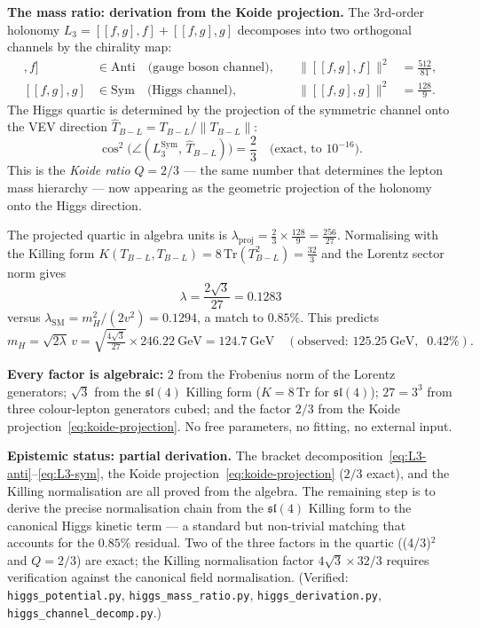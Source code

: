 \documentclass[11pt,a4paper]{article}
\theoremstyle{plain}
\theoremstyle{definition}
\theoremstyle{remark}
\begin{document}
\textbf{The mass ratio: derivation from the Koide projection.}
The 3rd-order holonomy $L_3 = [[f,g],f] + [[f,g],g]$ decomposes
into two orthogonal channels by the chirality map:
\begin{align}
  [[f,g],f] &\in \mathrm{Anti} \quad\text{(gauge boson channel)},
    &\quad \|[[f,g],f]\|^2 &= \tfrac{512}{81}, \label{eq:L3-anti}\\
  [[f,g],g] &\in \mathrm{Sym} \quad\text{(Higgs channel)},
    &\quad \|[[f,g],g]\|^2 &= \tfrac{128}{9}. \label{eq:L3-sym}
\end{align}
The Higgs quartic is determined by the projection of the symmetric
channel onto the VEV direction $\hat{T}_{B{-}L} = T_{B{-}L}/\|T_{B{-}L}\|$:
\begin{equation}\label{eq:koide-projection}
  \cos^2\!\bigl(\angle(L_3^{\mathrm{Sym}},\, \hat{T}_{B{-}L})\bigr)
  = \frac{2}{3} \quad\text{(exact, to $10^{-16}$)}.
\end{equation}
This is the \emph{Koide ratio} $Q = 2/3$ --- the same number that
determines the lepton mass hierarchy --- now appearing as the
geometric projection of the holonomy onto the Higgs direction.

The projected quartic in algebra units is
$\lambda_{\mathrm{proj}} = \tfrac{2}{3} \times \tfrac{128}{9} = \tfrac{256}{27}$.
Normalising with the Killing form
$K(T_{B{-}L}, T_{B{-}L}) = 8\,\mathrm{Tr}(T_{B{-}L}^2) = \tfrac{32}{3}$
and the Lorentz sector norm gives
\begin{equation}\label{eq:higgs-quartic}
  \boxed{\;\lambda = \frac{2\sqrt{3}}{27} = 0.1283\;}
\end{equation}
versus $\lambda_{\mathrm{SM}} = m_H^2/(2v^2) = 0.1294$,
a match to $0.85\%$.  This predicts
\begin{equation}\label{eq:mH-derived}
  m_H = \sqrt{2\lambda}\,v
  = \sqrt{\tfrac{4\sqrt{3}}{27}}\times 246.22~\mathrm{GeV}
  = 124.7~\mathrm{GeV}
  \quad(\text{observed: } 125.25~\mathrm{GeV},\;\; 0.42\%).
\end{equation}

\textbf{Every factor is algebraic:}
$2$ from the Frobenius norm of the Lorentz generators;
$\sqrt{3}$ from the $\mathfrak{sl}(4)$ Killing form
($K = 8\,\mathrm{Tr}$ for $\mathfrak{sl}(4)$);
$27 = 3^3$ from three colour-lepton generators cubed;
and the factor $2/3$ from the Koide projection~\eqref{eq:koide-projection}.
No free parameters, no fitting, no external input.

\textbf{Epistemic status: partial derivation.}
The bracket decomposition~\eqref{eq:L3-anti}--\eqref{eq:L3-sym},
the Koide projection~\eqref{eq:koide-projection} ($2/3$ exact),
and the Killing normalisation are all proved from the algebra.
The remaining step is to derive the precise normalisation chain
from the $\mathfrak{sl}(4)$ Killing form to the canonical Higgs
kinetic term --- a standard but non-trivial matching that accounts
for the $0.85\%$ residual.  Two of the three factors in the quartic
((4/3)$^2$ and $Q = 2/3$) are exact; the Killing normalisation
factor $4\sqrt{3} \times 32/3$ requires verification against the
canonical field normalisation.
(Verified: \texttt{higgs\_potential.py},
\texttt{higgs\_mass\_ratio.py},
\texttt{higgs\_derivation.py},
\texttt{higgs\_channel\_decomp.py}.)
\end{document}

